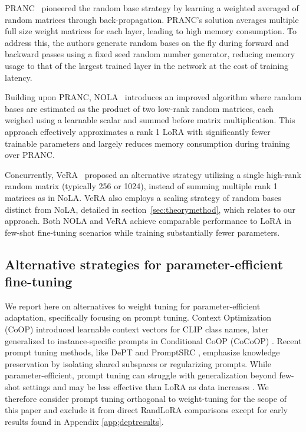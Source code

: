 PRANC~\citep{2023_ICCV_PRANC} pioneered the random base strategy by learning a weighted averaged of random matrices through back-propagation. PRANC's solution averages multiple full size weight matrices for each layer, leading to high memory consumption. To address this, the authors generate random bases on the fly during forward and backward passes using a fixed seed random number generator, reducing memory usage to that of the largest trained layer in the network at the cost of training latency.

Building upon PRANC, NOLA~\citep{2024_ICLR_NoLA} introduces an improved algorithm where random bases are estimated as the product of two low-rank random matrices, each weighed using a learnable scalar and summed before matrix multiplication. This approach effectively approximates a rank 1 LoRA with significantly fewer trainable parameters and largely reduces memory consumption during training over PRANC.

Concurrently, VeRA~\citep{2024_ICLR_VeRA} proposed an alternative strategy utilizing a single high-rank random matrix (typically 256 or 1024), instead of summing multiple rank 1 matrices as in NoLA. VeRA also employs a scaling strategy of random bases distinct from NoLA, detailed in section~\ref{sec:theorymethod}, which relates to our approach. Both NOLA and VeRA achieve comparable performance to LoRA in few-shot fine-tuning scenarios while training substantially fewer parameters.

\subsection{Alternative strategies for parameter-efficient fine-tuning}
We report here on alternatives to weight tuning for parameter-efficient adaptation, specifically focusing on prompt tuning.  Context Optimization (CoOP) \citep{2022_IJCV_CoOP} introduced learnable context vectors for CLIP class names, later generalized to instance-specific prompts in Conditional CoOP (CoCoOP) \citep{2022_CVPR_CoCoOP}. Recent prompt tuning methods, like DePT \citep{2024_CVPR_DEPT} and PromptSRC \citep{2023_CVPR_PromptSRC}, emphasize knowledge preservation by isolating shared subspaces or regularizing prompts.  While parameter-efficient, prompt tuning can struggle with generalization beyond few-shot settings \citep{2024_arxiv_peftsurvey} and may be less effective than LoRA as data increases \citep{2024_CVPR_promptvslora}. We therefore consider prompt tuning orthogonal to weight-tuning for the scope of this paper and exclude it from direct RandLoRA comparisons except for early results found in Appendix \ref{app;deptresults}.